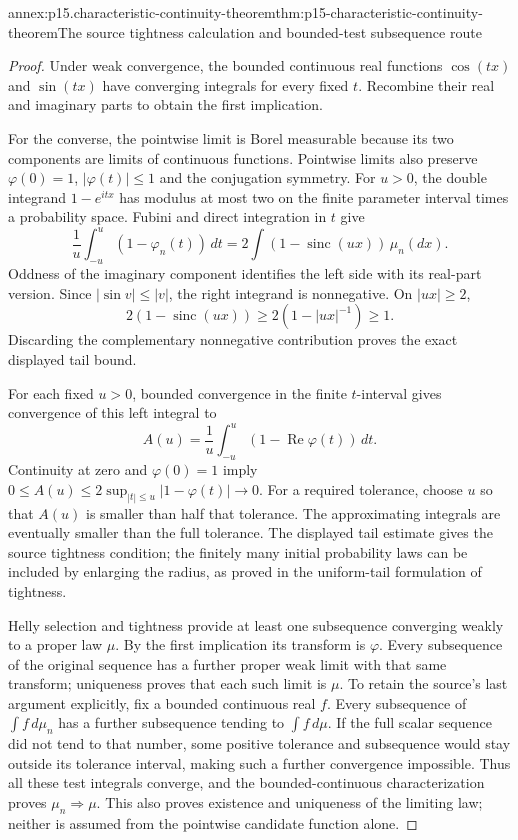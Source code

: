 \begin{annexitem}{annex:p15.characteristic-continuity-theorem}{thm:p15-characteristic-continuity-theorem}{The source tightness calculation and bounded-test subsequence route}
\begin{proof}
Under weak convergence, the bounded continuous real
functions \(\cos(tx)\) and \(\sin(tx)\) have converging
integrals for every fixed \(t\). Recombine their real
and imaginary parts to obtain the first implication.

For the converse, the pointwise limit is Borel measurable
because its two components are limits of continuous functions.
Pointwise limits also preserve
\(\varphi(0)=1\), \(|\varphi(t)|\leq1\) and the
conjugation symmetry.
For \(u>0\), the double integrand \(1-e^{itx}\)
has modulus at most two on the finite parameter
interval times a probability space. Fubini and
direct integration in \(t\) give
\[
 \frac1u\int_{-u}^u(1-\varphi_n(t))\,dt
       =2\int(1-\operatorname{sinc}(ux))\,\mu_n(dx).
\]
Oddness of the imaginary component identifies the
left side with its real-part version.
Since \(|\sin v|\leq|v|\), the right integrand is
nonnegative. On \(|ux|\geq2\),
\[
 2(1-\operatorname{sinc}(ux))
                    \geq2(1-|ux|^{-1})\geq1.
\]
Discarding the complementary nonnegative contribution
proves the exact displayed tail bound.

For each fixed \(u>0\), bounded convergence in the
finite \(t\)-interval gives convergence of this
left integral to
\[
 A(u)=\frac1u\int_{-u}^u
                  (1-\operatorname{Re}\varphi(t))\,dt.
\]
Continuity at zero and \(\varphi(0)=1\) imply
\(0\leq A(u)\leq2\sup_{|t|\leq u}|1-\varphi(t)|\to0\).
For a required tolerance, choose \(u\) so that \(A(u)\)
is smaller than half that tolerance. The approximating
integrals are eventually smaller than the full tolerance.
The displayed tail estimate gives the source tightness
condition; the finitely many initial probability laws
can be included by enlarging the radius, as proved in
the uniform-tail formulation of tightness.

Helly selection and tightness provide at least one
subsequence converging weakly to a proper law \(\mu\).
By the first implication its transform is \(\varphi\).
Every subsequence of the original sequence has a
further proper weak limit with that same transform;
uniqueness proves that each such limit is \(\mu\).
To retain the source's last argument explicitly, fix
a bounded continuous real \(f\). Every subsequence of
\(\int f\,d\mu_n\) has a further subsequence tending
to \(\int f\,d\mu\).
If the full scalar sequence did not tend to that
number, some positive tolerance and subsequence
would stay outside its tolerance interval, making
such a further convergence impossible.
Thus all these test integrals converge, and the
bounded-continuous characterization proves
\(\mu_n\Rightarrow\mu\).
This also proves existence and uniqueness of the
limiting law; neither is assumed from the pointwise
candidate function alone.
\end{proof}
\end{annexitem}

